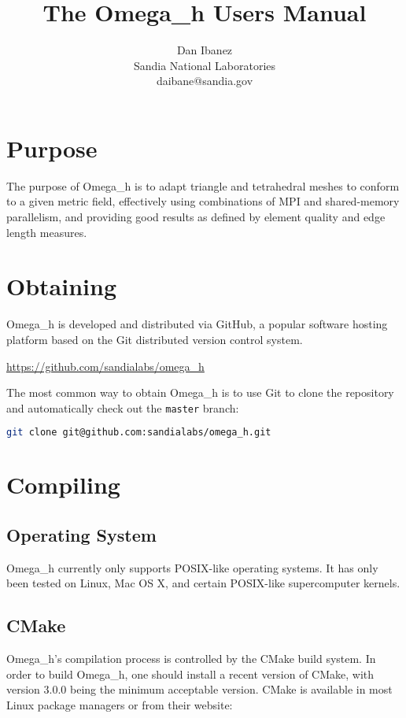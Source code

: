 \documentclass{article}
\title{The Omega\_h Users Manual}
\author{Dan Ibanez\\
Sandia National Laboratories\\
daibane@sandia.gov}
\begin{document}
\maketitle

\section{Purpose}

The purpose of Omega\_h is to adapt triangle and tetrahedral
meshes to conform to a given metric field,
effectively using combinations of MPI and shared-memory parallelism,
and providing good results as defined by element quality and
edge length measures.

\section{Obtaining}

Omega\_h is developed and distributed via GitHub,
a popular software hosting platform based on the
Git distributed version control system.

\url{https://github.com/sandialabs/omega_h}

The most common way to obtain Omega\_h is to
use Git to clone the repository and automatically
check out the \texttt{master} branch:

\begin{lstlisting}[language=bash]
git clone git@github.com:sandialabs/omega_h.git
\end{lstlisting}

\section{Compiling}

\subsection{Operating System}

Omega\_h currently only supports POSIX-like operating systems.
It has only been tested on Linux, Mac OS X, and certain POSIX-like
supercomputer kernels.

\subsection{CMake}

Omega\_h's compilation process is controlled by the CMake
build system.
In order to build Omega\_h, one should install a recent
version of CMake, with version 3.0.0 being the minimum
acceptable version.
CMake is available in most Linux package managers
or from their website:
\end{document}
